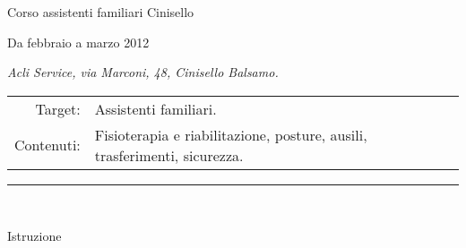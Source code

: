 \documentclass{article}
\makeatletter
\newcommand{\titolo}[1]{\bgroup\rule{\linewidth}{1pt}\\[-14pt]
\null\hfill\fontsize{10pt}{12pt}\sc\selectfont\strut#1\\[7pt]\egroup}
\newcommand{\docenza}[5]{%
{\fontsize{14pt}{17pt}\selectfont\strut#1}\hfill\strut#2\\[-7pt]
\begin{adjustwidth}{28pt}{0pt}
\fontsize{10pt}{12pt}\selectfont\strut\textit{#3}\\
\end{adjustwidth}
\vspace{-3.5pt}
\begin{adjustwidth}{-21pt}{0pt}
\begin{tabular}{@{}r@{\hspace{7pt}}p{\linewidth-56pt}}
\fontsize{10pt}{12pt}\selectfont\strut Target: & #4\\
\fontsize{10pt}{12pt}\selectfont\strut Contenuti: &#5\\[7pt]
\end{tabular}
\end{adjustwidth}
}
\makeatother
\begin{document}
\docenza{Corso assistenti familiari Cinisello}{Da febbraio a marzo 2012}{Acli Service, via Marconi, 48, Cinisello Balsamo.}{Assistenti familiari.}{Fisioterapia e riabilitazione, posture, ausili, trasferimenti, sicurezza.}

\newcommand{\paragrafo}[1]{{\fontsize{10pt}{12pt}\selectfont#1}\\[7pt]}

\newcommand{\diploma}[4]{{\fontsize{14pt}{17pt}\selectfont#1}\hfill#2\\
\begin{adjustwidth}{28pt}{28pt}
\it #3\\
\end{adjustwidth}}

\newcommand{\universitaPD}[5]{#1\hfill#2\\#3\\#4\\ #5}

\newcommand{\universitaMIB}[7]{{\fontsize{14pt}{17pt}\selectfont#1}\hfill#2\\
\begin{adjustwidth}{28pt}{28pt}
3: #3\\
4: #4\\
5: #5\\
6: #6\\
7: #7
\end{adjustwidth}}


\newcommand{\universita}[4]{{\fontsize{14pt}{17pt}\selectfont#1}\hfill#2\\
\begin{adjustwidth}{28pt}{28pt}
\textit{#3}\\
#4\\[14pt]
\end{adjustwidth}}

\vfill
\titolo{Istruzione}



\end{document}
